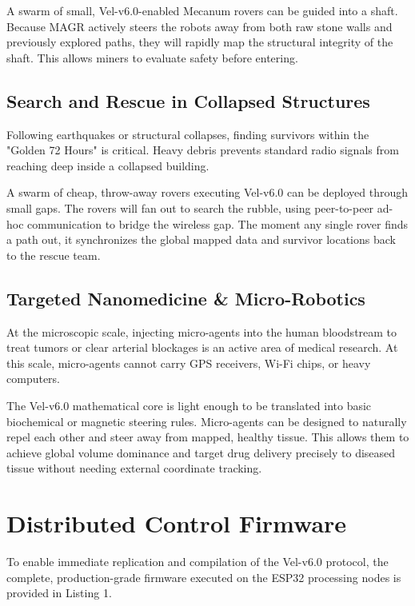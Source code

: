 \documentclass[letterpaper, 10pt, conference]{IEEEtran}
\begin{document}
A swarm of small, Vel-v6.0-enabled Mecanum rovers can be guided into a shaft. Because MAGR actively steers the robots away from both raw stone walls and previously explored paths, they will rapidly map the structural integrity of the shaft. This allows miners to evaluate safety before entering.

\subsection{Search and Rescue in Collapsed Structures}
Following earthquakes or structural collapses, finding survivors within the "Golden 72 Hours" is critical. Heavy debris prevents standard radio signals from reaching deep inside a collapsed building.

A swarm of cheap, throw-away rovers executing Vel-v6.0 can be deployed through small gaps. The rovers will fan out to search the rubble, using peer-to-peer ad-hoc communication to bridge the wireless gap. The moment any single rover finds a path out, it synchronizes the global mapped data and survivor locations back to the rescue team.

\subsection{Targeted Nanomedicine \& Micro-Robotics}
At the microscopic scale, injecting micro-agents into the human bloodstream to treat tumors or clear arterial blockages is an active area of medical research. At this scale, micro-agents cannot carry GPS receivers, Wi-Fi chips, or heavy computers.

The Vel-v6.0 mathematical core is light enough to be translated into basic biochemical or magnetic steering rules. Micro-agents can be designed to naturally repel each other and steer away from mapped, healthy tissue. This allows them to achieve global volume dominance and target drug delivery precisely to diseased tissue without needing external coordinate tracking.

\section{Distributed Control Firmware}
\label{sec:firmware}

To enable immediate replication and compilation of the Vel-v6.0 protocol, the complete, production-grade firmware executed on the ESP32 processing nodes is provided in Listing 1.
\end{document}

